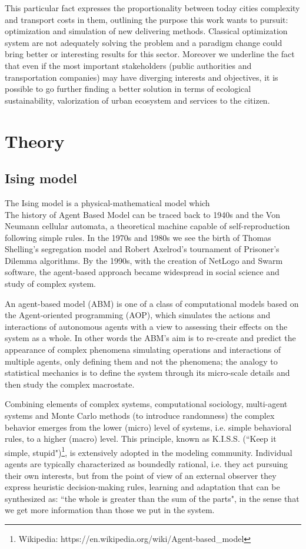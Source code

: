 \documentclass[11pt,a4paper]{article}
\begin{document}
This particular fact expresses the proportionality between today cities complexity and transport costs in them, outlining the purpose this work wants to pursuit: optimization and simulation of new delivering methods. 
Classical optimization system are not adequately solving the problem and a paradigm change could bring better or interesting results for this sector. 
Moreover we underline the fact that even if the most important stakeholders (public authorities and transportation companies) may have diverging interests and objectives, it is possible to go further finding a better solution in terms of ecological sustainability, valorization of urban ecosystem and services to the citizen. 

\newpage 
\section{Theory}
\subsection{Ising model}
The Ising model is a physical-mathematical model which \\
The history of Agent Based Model can be traced back to 1940s and the Von Neumann cellular automata, a theoretical machine capable of self-reproduction following simple rules.
In the 1970s and 1980s we see the birth of Thomas Shelling's segregation model and Robert Axelrod's tournament of Prisoner's Dilemma algorithms.
By the 1990s, with the creation of NetLogo and Swarm software, the agent-based approach became widespread in social science and study of complex system.

An agent-based model (ABM) is one of a class of computational models based on the Agent-oriented programming (AOP), which simulates the actions and interactions of autonomous agents with a view to assessing their effects on the system as a whole. 
In other words the ABM's aim is to re-create and predict the appearance of complex phenomena simulating operations and interactions of multiple agents, only defining them and not the phenomena; the analogy to statistical mechanics is to define the system through its micro-scale details and then study the complex macrostate. 

Combining elements of complex systems, computational sociology, multi-agent systems and Monte Carlo methods (to introduce randomness) the complex behavior emerges from the lower (micro) level of systems, i.e. simple behavioral rules, to a higher (macro) level. 
This principle, known as K.I.S.S. (“Keep it simple, stupid")\footnote{Wikipedia: https://en.wikipedia.org/wiki/Agent-based\_model}, is extensively adopted in the modeling community. Individual agents are typically characterized as boundedly rational, i.e. they act pursuing their own interests, but from the point of view of an external observer they express heuristic decision-making rules, learning and adaptation that can be synthesized as: “the whole is greater than the sum of the parts", in the sense that we get more information than those we put in the system.
\end{document}
